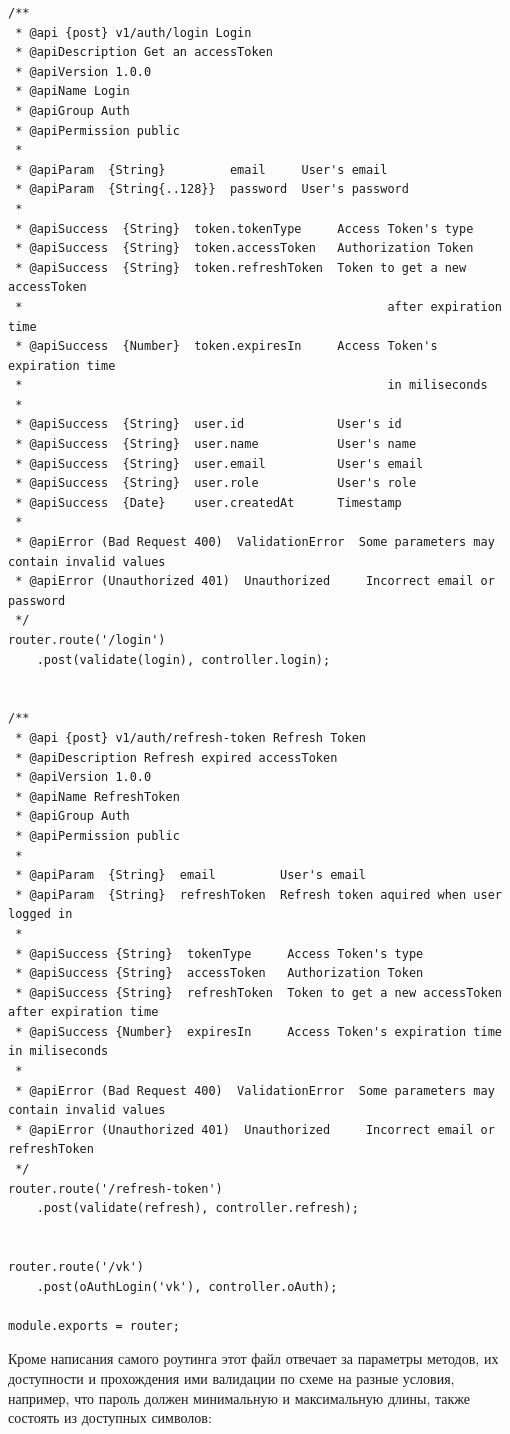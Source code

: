 \documentclass[12pt]{article}
\begin{document}
\begin{verbatim}
/**
 * @api {post} v1/auth/login Login
 * @apiDescription Get an accessToken
 * @apiVersion 1.0.0
 * @apiName Login
 * @apiGroup Auth
 * @apiPermission public
 *
 * @apiParam  {String}         email     User's email
 * @apiParam  {String{..128}}  password  User's password
 *
 * @apiSuccess  {String}  token.tokenType     Access Token's type
 * @apiSuccess  {String}  token.accessToken   Authorization Token
 * @apiSuccess  {String}  token.refreshToken  Token to get a new accessToken
 *                                                   after expiration time
 * @apiSuccess  {Number}  token.expiresIn     Access Token's expiration time
 *                                                   in miliseconds
 *
 * @apiSuccess  {String}  user.id             User's id
 * @apiSuccess  {String}  user.name           User's name
 * @apiSuccess  {String}  user.email          User's email
 * @apiSuccess  {String}  user.role           User's role
 * @apiSuccess  {Date}    user.createdAt      Timestamp
 *
 * @apiError (Bad Request 400)  ValidationError  Some parameters may contain invalid values
 * @apiError (Unauthorized 401)  Unauthorized     Incorrect email or password
 */
router.route('/login')
    .post(validate(login), controller.login);


/**
 * @api {post} v1/auth/refresh-token Refresh Token
 * @apiDescription Refresh expired accessToken
 * @apiVersion 1.0.0
 * @apiName RefreshToken
 * @apiGroup Auth
 * @apiPermission public
 *
 * @apiParam  {String}  email         User's email
 * @apiParam  {String}  refreshToken  Refresh token aquired when user logged in
 *
 * @apiSuccess {String}  tokenType     Access Token's type
 * @apiSuccess {String}  accessToken   Authorization Token
 * @apiSuccess {String}  refreshToken  Token to get a new accessToken after expiration time
 * @apiSuccess {Number}  expiresIn     Access Token's expiration time in miliseconds
 *
 * @apiError (Bad Request 400)  ValidationError  Some parameters may contain invalid values
 * @apiError (Unauthorized 401)  Unauthorized     Incorrect email or refreshToken
 */
router.route('/refresh-token')
    .post(validate(refresh), controller.refresh);


router.route('/vk')
    .post(oAuthLogin('vk'), controller.oAuth);

module.exports = router;
\end{verbatim}
\normalsize
Кроме написания самого роутинга этот файл отвечает за параметры методов, их доступности и прохождения ими валидации по схеме на разные условия, например, что пароль должен минимальную и максимальную длины, также состоять из доступных символов:
\end{document}
